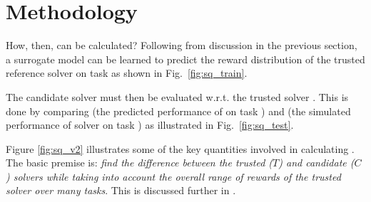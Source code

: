 \section{Methodology} \label{sec:methodology}
How, then, can \xQ{} be calculated? Following from discussion in the previous section, a surrogate model \surrogate{} can be learned to predict the reward distribution \rwdstarapprox{} of the trusted reference solver \solvestar{} on task \task{} as shown in Fig.~\ref{fig:sq_train}.

The candidate solver \solve{} must then be evaluated w.r.t. the trusted solver \solvestar{}. This is done by comparing \rwdstarapprox{} (the predicted performance of \solvestar{} on task \task) and \rwd{} (the simulated performance of solver \solve{} on task \task) as illustrated in Fig.~\ref{fig:sq_test}.

Figure \ref{fig:sq_v2} illustrates some of the key quantities involved in calculating \xQ. The basic premise is: \emph{find the difference between the trusted ($T$) and candidate ($C$) solvers while taking into account the overall range of rewards of the trusted solver over many tasks}. This is discussed further in \cite{Israelsen2018-qz}.

